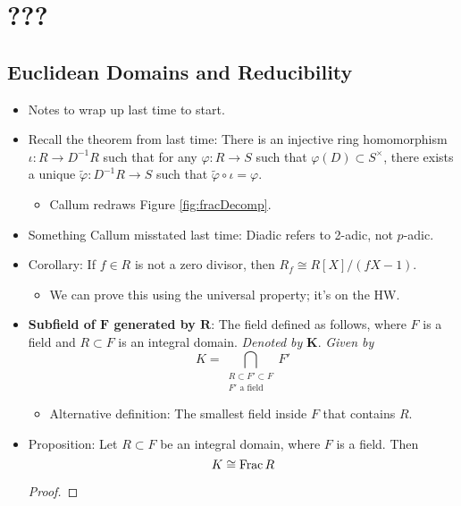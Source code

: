 \documentclass[../notes.tex]{subfiles}
\begin{document}
\chapter{???}
\section{Euclidean Domains and Reducibility}
\begin{itemize}
    \item {}Notes to wrap up last time to start.
    \item Recall the theorem from last time: There is an injective ring homomorphism $\iota:R\to D^{-1}R$ such that for any $\varphi:R\to S$ such that $\varphi(D)\subset S^\times$, there exists a unique $\tilde{\varphi}:D^{-1}R\to S$ such that $\tilde{\varphi}\circ\iota=\varphi$.
    \begin{itemize}
        \item Callum redraws Figure \ref{fig:fracDecomp}.
    \end{itemize}
    \item Something Callum misstated last time: Diadic refers to 2-adic, not $p$-adic.
    \item Corollary: If $f\in R$ is not a zero divisor, then $R_f\cong R[X]/(fX-1)$.
    \begin{itemize}
        \item We can prove this using the universal property; it's on the HW.
    \end{itemize}
    \item \textbf{Subfield of $\bm{F}$ generated by $\bm{R}$}: The field defined as follows, where $F$ is a field and $R\subset F$ is an integral domain. \emph{Denoted by} $\bm{K}$. \emph{Given by}
    \begin{equation*}
        K = \bigcap_{\substack{R\subset F'\subset F\\F'\text{ a field}}}F'
    \end{equation*}
    \begin{itemize}
        \item Alternative definition: The smallest field inside $F$ that contains $R$.
    \end{itemize}
    \item Proposition: Let $R\subset F$ be an integral domain, where $F$ is a field. Then
    \begin{equation*}
        K \cong \operatorname{Frac} R
    \end{equation*}
    \begin{proof}

\end{proof}
\end{itemize}
\end{document}
